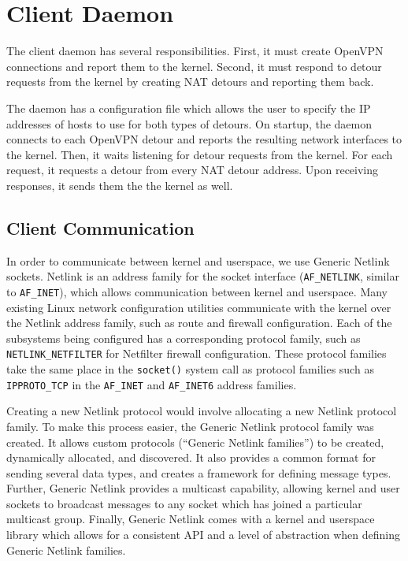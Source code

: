 \documentclass{cwru}
\begin{document}
\section{Client Daemon}

The client daemon has several responsibilities. First, it must create OpenVPN
connections and report them to the kernel. Second, it must respond to detour
requests from the kernel by creating NAT detours and reporting them back.

The daemon has a configuration file which allows the user to specify the IP
addresses of hosts to use for both types of detours. On startup, the daemon
connects to each OpenVPN detour and reports the resulting network interfaces to
the kernel. Then, it waits listening for detour requests from the kernel. For
each request, it requests a detour from every NAT detour address. Upon receiving
responses, it sends them the the kernel as well.

\subsection{Client Communication}

In order to communicate between kernel and userspace, we use Generic Netlink
sockets. Netlink is an address family for the socket interface
(\texttt{AF\_NETLINK}, similar to \texttt{AF\_INET}), which allows communication
between kernel and userspace. Many existing Linux network configuration
utilities communicate with the kernel over the Netlink address family, such as
route and firewall configuration. Each of the subsystems being configured has a
corresponding protocol family, such as \texttt{NETLINK\_NETFILTER} for Netfilter
firewall configuration. These protocol families take the same place in the
\texttt{socket()} system call as protocol families such as \texttt{IPPROTO\_TCP}
in the \texttt{AF\_INET} and \texttt{AF\_INET6} address families.

Creating a new Netlink protocol would involve allocating a new Netlink protocol
family. To make this process easier, the Generic Netlink protocol family was
created. It allows custom protocols (``Generic Netlink families'') to be
created, dynamically allocated, and discovered. It also provides a common format
for sending several data types, and creates a framework for defining message
types. Further, Generic Netlink provides a multicast capability, allowing kernel
and user sockets to broadcast messages to any socket which has joined a
particular multicast group. Finally, Generic Netlink comes with a kernel and
userspace library which allows for a consistent API and a level of abstraction
when defining Generic Netlink families.
\end{document}
